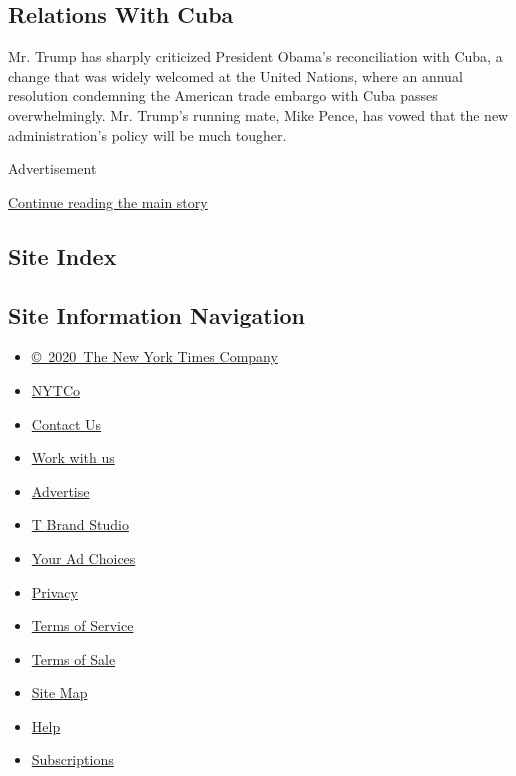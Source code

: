 \hypertarget{relations-with-cuba}{%
\subsection{Relations With Cuba}\label{relations-with-cuba}}

Mr. Trump has sharply criticized President Obama's reconciliation with
Cuba, a change that was widely welcomed at the United Nations, where an
annual resolution condemning the American trade embargo with Cuba passes
overwhelmingly. Mr. Trump's running mate, Mike Pence, has vowed that the
new administration's policy will be much tougher.

Advertisement

\protect\hyperlink{after-bottom}{Continue reading the main story}

\hypertarget{site-index}{%
\subsection{Site Index}\label{site-index}}

\hypertarget{site-information-navigation}{%
\subsection{Site Information
Navigation}\label{site-information-navigation}}

\begin{itemize}
\tightlist
\item
  \href{https://help.nytimes.com/hc/en-us/articles/115014792127-Copyright-notice}{©~2020~The
  New York Times Company}
\end{itemize}

\begin{itemize}
\tightlist
\item
  \href{https://www.nytco.com/}{NYTCo}
\item
  \href{https://help.nytimes.com/hc/en-us/articles/115015385887-Contact-Us}{Contact
  Us}
\item
  \href{https://www.nytco.com/careers/}{Work with us}
\item
  \href{https://nytmediakit.com/}{Advertise}
\item
  \href{http://www.tbrandstudio.com/}{T Brand Studio}
\item
  \href{https://www.nytimes.com/privacy/cookie-policy\#how-do-i-manage-trackers}{Your
  Ad Choices}
\item
  \href{https://www.nytimes.com/privacy}{Privacy}
\item
  \href{https://help.nytimes.com/hc/en-us/articles/115014893428-Terms-of-service}{Terms
  of Service}
\item
  \href{https://help.nytimes.com/hc/en-us/articles/115014893968-Terms-of-sale}{Terms
  of Sale}
\item
  \href{https://spiderbites.nytimes.com}{Site Map}
\item
  \href{https://help.nytimes.com/hc/en-us}{Help}
\item
  \href{https://www.nytimes.com/subscription?campaignId=37WXW}{Subscriptions}
\end{itemize}
